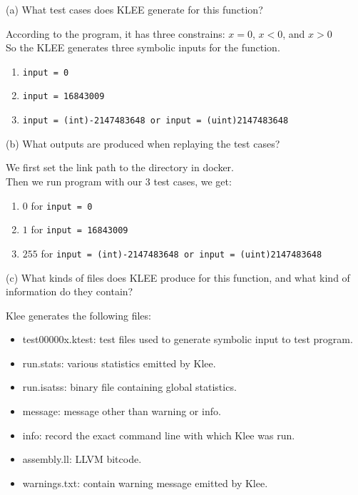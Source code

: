 \documentclass[12pt,letterpaper]{article}
\begin{document}
  \vspace{4mm}

\noindent (a) What test cases does KLEE generate for this function?
\begin{mdframed}
  According to the program, it has three constrains: \(x=0\), \(x<0\), and \(x>0\)\\
  So the KLEE generates three symbolic inputs for the function.

  \begin{enumerate}
    \item \texttt{input = 0}
    \item \texttt{input = 16843009}
    \item \texttt{input = (int)-2147483648 or input = (uint)2147483648}
  \end{enumerate}

\end{mdframed}

\newpage

\noindent (b) What outputs are produced when replaying the test cases?
\begin{mdframed}
  We first set the link path to the directory in docker.\\
  Then we run program with our 3 test cases, we get:
  \begin{enumerate}
    \item \(0\) for \texttt{input = 0}
    \item \(1\) for \texttt{input = 16843009}
    \item \(255\) for \texttt{input = (int)-2147483648 or input = (uint)2147483648}
  \end{enumerate}
\end{mdframed}

\newpage

\noindent (c) What kinds of files does KLEE produce for this function,
and what kind of information do they contain?
\begin{mdframed}
  Klee generates the following files:
  \begin{itemize}
    \item test00000x.ktest: test files used to generate symbolic input to test program.
    \item run.stats: various statistics emitted by Klee.
    \item run.isatss: binary file containing global statistics.
    \item message: message other than warning or info.
    \item info: record the exact command line with which Klee was run.
    \item assembly.ll: LLVM bitcode.
    \item warnings.txt: contain warning message emitted by Klee.
  \end{itemize}

\end{mdframed}
\end{document}
